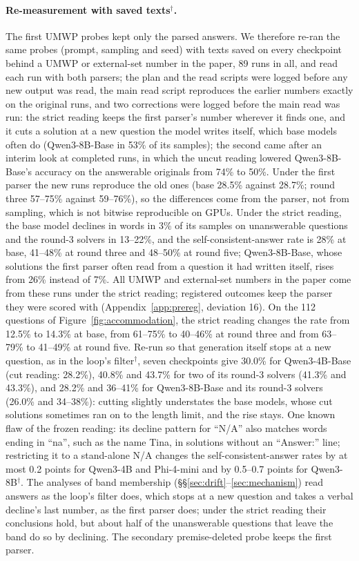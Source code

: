 \paragraph{Re-measurement with saved texts$^{\dagger}$.} The first UMWP probes kept only the parsed answers. We therefore re-ran the same probes (prompt, sampling and seed) with texts saved on every checkpoint behind a UMWP or external-set number in the paper, 89 runs in all, and read each run with both parsers; the plan and the read scripts were logged before any new output was read, the main read script reproduces the earlier numbers exactly on the original runs, and two corrections were logged before the main read was run: the strict reading keeps the first parser's number wherever it finds one, and it cuts a solution at a new question the model writes itself, which base models often do (Qwen3-8B-Base in 53\% of its samples); the second came after an interim look at completed runs, in which the uncut reading lowered Qwen3-8B-Base's accuracy on the answerable originals from 74\% to 50\%. Under the first parser the new runs reproduce the old ones (base 28.5\% against 28.7\%; round three 57--75\% against 59--76\%), so the differences come from the parser, not from sampling, which is not bitwise reproducible on GPUs. Under the strict reading, the base model declines in words in 3\% of its samples on unanswerable questions and the round-3 solvers in 13--22\%, and the self-consistent-answer rate is 28\% at base, 41--48\% at round three and 48--50\% at round five; Qwen3-8B-Base, whose solutions the first parser often read from a question it had written itself, rises from 26\% instead of 7\%. All UMWP and external-set numbers in the paper come from these runs under the strict reading; registered outcomes keep the parser they were scored with (Appendix~\ref{app:prereg}, deviation 16). On the 112 questions of Figure~\ref{fig:accommodation}, the strict reading changes the rate from 12.5\% to 14.3\% at base, from 61--75\% to 40--46\% at round three and from 63--79\% to 41--49\% at round five. Re-run so that generation itself stops at a new question, as in the loop's filter$^{\dagger}$, seven checkpoints give 30.0\% for Qwen3-4B-Base (cut reading: 28.2\%), 40.8\% and 43.7\% for two of its round-3 solvers (41.3\% and 43.3\%), and 28.2\% and 36--41\% for Qwen3-8B-Base and its round-3 solvers (26.0\% and 34--38\%): cutting slightly understates the base models, whose cut solutions sometimes ran on to the length limit, and the rise stays. One known flaw of the frozen reading: its decline pattern for ``N/A'' also matches words ending in ``na'', such as the name Tina, in solutions without an ``Answer:'' line; restricting it to a stand-alone N/A changes the self-consistent-answer rates by at most 0.2 points for Qwen3-4B and Phi-4-mini and by 0.5--0.7 points for Qwen3-8B$^{\dagger}$. The analyses of band membership (\S\S\ref{sec:drift}--\ref{sec:mechanism}) read answers as the loop's filter does, which stops at a new question and takes a verbal decline's last number, as the first parser does; under the strict reading their conclusions hold, but about half of the unanswerable questions that leave the band do so by declining. The secondary premise-deleted probe keeps the first parser.

